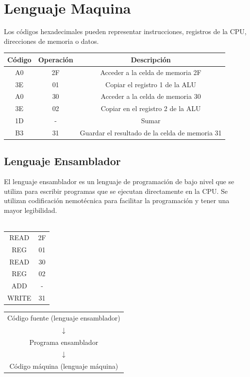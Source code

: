 \documentclass{templateNote}
\begin{document}
\section{Lenguaje Maquina}
\noindent Los códigos hexadecimales pueden representar instrucciones, registros de la CPU, direcciones de memoria o datos.
\begin{tcolorbox}[colback=blue!10!white,colframe=blue!75!black,title=Ejemplo]
    \begin{table}[H]
        \centering
            \begin{tabular}{|c|c|c|}
            \hline
            Código & Operación & Descripción \\
            \hline
            A0 & 2F & Acceder a la celda de memoria 2F \\
            3E & 01 & Copiar el registro 1 de la ALU \\
            A0 & 30 & Acceder a la celda de memoria 30 \\
            3E & 02 & Copiar en el registro 2 de la ALU \\
            1D & - & Sumar \\
            B3 & 31 & Guardar el resultado de la celda de memoria 31 \\
            \hline
            \end{tabular}
    \end{table}
\end{tcolorbox}
\subsection{Lenguaje Ensamblador}
\noindent El lenguaje ensamblador es un lenguaje de programación de bajo nivel que se utiliza para escribir programas que se ejecutan directamente en la CPU.
Se utilizan codificación nemotécnica para facilitar la programación y tener una mayor legibilidad.\\\\
\begin{minipage}[c]{0.5\textwidth}
\begin{table}[H]
    \centering
    \begin{tabular}{|c|c|}
    \hline
    READ & 2F \\
    REG & 01 \\
    READ & 30 \\
    REG & 02 \\
    ADD & - \\
    WRITE & 31 \\
    \hline
    \end{tabular}
\end{table}
\end{minipage}
\begin{minipage}[c]{0.5\textwidth}
\centering
\begin{tabular}{c}
    Código fuente (lenguaje ensamblador)\\
    $\downarrow$\\
    Programa ensamblador\\
    $\downarrow$\\
    Código máquina (lenguaje máquina)\\
\end{tabular}
\end{minipage}
\end{document}
